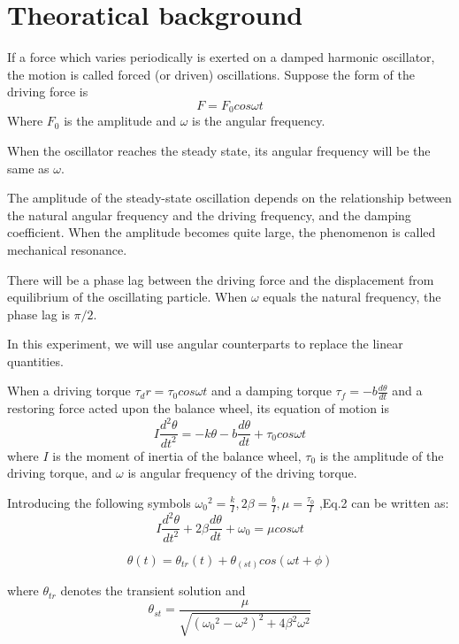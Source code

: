 \documentclass[12pt,a4paper]{article}
\begin{document}
\section{Theoratical background}
If a force which varies periodically is exerted on a damped harmonic oscillator, the motion is called forced (or driven) oscillations. Suppose the form of the driving force is 
\begin{equation}
    F=F_0cos\omega t
\end{equation} 
Where $F_0$ is the amplitude and $\omega$ is the angular frequency. \par 
When the oscillator reaches the steady state, its angular frequency will be the same as $\omega$. \par 
The amplitude of the steady-state oscillation depends on the relationship between the natural angular frequency and the driving frequency, and the damping coefficient. When the amplitude becomes quite large, the phenomenon is called mechanical resonance. \par 
There will be a phase lag between the driving force and the displacement from equilibrium of the oscillating particle. When $\omega$ equals the natural frequency, the phase lag is $\pi/2$. \par 
In this experiment, we will use angular counterparts to replace the linear quantities. \par 
When a driving torque $\tau_dr=\tau_0 cos\omega t$ and a damping torque $\tau_f=-b\frac{d\theta}{dt}$ and a restoring force acted upon the balance wheel, its equation of motion is
\begin{equation}
    I\frac{d^2\theta}{dt^2}=-k\theta-b\frac{d\theta}{dt}+\tau_0cos\omega t
\end{equation}
where $I$ is the moment of inertia of the balance wheel, $\tau_0$ is the amplitude of the driving torque, and $\omega$ is angular frequency of the driving torque. \par 
Introducing the following symbols $ {ω_0}^2=\frac{k}{I}, 2\beta=\frac{b}{I},\mu=\frac{\tau_0}{I}$ ,Eq.2 can be written as:
\begin{equation}
    I\frac{d^2\theta}{dt^2}+2\beta\frac{d\theta}{dt}+{\omega_0}=\mu cos\omega t
\end{equation}

\begin{equation}
    \theta(t)=\theta_{tr}(t)+\theta_(st)cos(\omega t+\phi)
\end{equation}

where $\theta_{tr}$ denotes the transient solution and
\begin{equation}
  \theta_{st}=\frac{\mu}{\sqrt{({\omega_0}^2-\omega^2)^2+4\beta^2\omega^2}} 
\end{equation} 
\par
\end{document}

